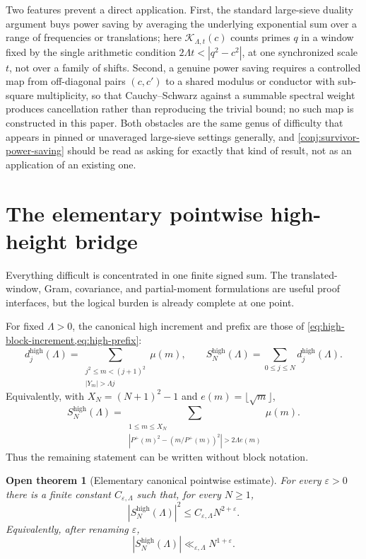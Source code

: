 \documentclass[11pt]{article}
\newtheorem{conjecture}[theorem]{Open theorem}
\theoremstyle{definition}
\newcommand{\eps}{\varepsilon}
\newcommand{\Pplus}{P^{+}}
\newcommand{\1}{\mathbf{1}}
\begin{document}
Two features prevent a direct application.  First, the standard large-sieve duality argument buys power saving by averaging the underlying exponential sum over a range of frequencies or translations; here $\mathcal K_{\Lambda,t}(c)$ counts primes $q$ in a window fixed by the single arithmetic condition $2\Lambda t<|q^2-c^2|$, at one synchronized scale $t$, not over a family of shifts.  Second, a genuine power saving requires a controlled map from off-diagonal pairs $(c,c')$ to a shared modulus or conductor with sub-square multiplicity, so that Cauchy--Schwarz against a summable spectral weight produces cancellation rather than reproducing the trivial bound; no such map is constructed in this paper.  Both obstacles are the same genus of difficulty that appears in pinned or unaveraged large-sieve settings generally, and \cref{conj:survivor-power-saving} should be read as asking for exactly that kind of result, not as an application of an existing one.


\section{The elementary pointwise high-height bridge}
\label{sec:high-sector}

Everything difficult is concentrated in one finite signed sum.  The translated-window, Gram, covariance, and partial-moment formulations are useful proof interfaces, but the logical burden is already complete at one point.

For fixed $\Lambda>0$, the canonical high increment and prefix are those of \cref{eq:high-block-increment,eq:high-prefix}:
\[
 d_j^{\mathrm{high}}(\Lambda)
 =
 \sum_{\substack{j^2\le m<(j+1)^2\\|Y_m|>\Lambda j}}\mu(m),
 \qquad
 S_N^{\mathrm{high}}(\Lambda)
 =\sum_{0\le j\le N}d_j^{\mathrm{high}}(\Lambda).
\]
Equivalently, with $X_N=(N+1)^2-1$ and $e(m)=\lfloor\sqrt m\rfloor$,
\begin{equation}
 \boxed{
 S_N^{\mathrm{high}}(\Lambda)
 =
 \sum_{\substack{1\le m\le X_N\\
 |\Pplus(m)^2-(m/\Pplus(m))^2|>2\Lambda e(m)}}\mu(m).
 }
 \label{eq:high-single-finite-sum}
\end{equation}
Thus the remaining statement can be written without block notation.

\begin{conjecture}[Elementary canonical pointwise estimate]
\label{conj:canonical-PHS}
For every $\eps>0$ there is a finite constant $C_{\eps,\Lambda}$ such that, for every $N\ge1$,
\begin{equation}
 \boxed{
 \left|S_N^{\mathrm{high}}(\Lambda)\right|^2
 \le C_{\eps,\Lambda}N^{2+\eps}.
 }
 \tag{PHS}
 \label{eq:canonical-PHS}
\end{equation}
Equivalently, after renaming $\eps$,
\begin{equation}
 \left|S_N^{\mathrm{high}}(\Lambda)\right|
 \ll_{\eps,\Lambda}N^{1+\eps}.
 \label{eq:canonical-PHS-linear}
\end{equation}
\end{conjecture}
\end{document}
